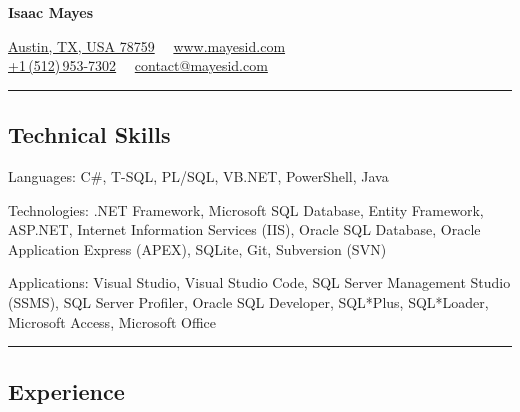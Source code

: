 \documentclass[9pt,letterpaper]{extarticle}
\newenvironment{indentsection}[1]%
{\begin{list}{}%
	{\setlength{\leftmargin}{#1}}%
	\item[]%
}
{\end{list}}
\begin{document}
\sffamily

\begin{center}
{\Huge \textbf{Isaac Mayes}}

\href{https://www.google.com/maps/place/Austin,+TX+78759/}{Austin, TX, USA 78759}\ \textbullet
\ \href{http://www.mayesid.com}{www.mayesid.com}
\\
\href{tel:+15129537302}{+1\,(512)\,953-7302}\ \textbullet
\ \href{mailto:contact@mayesid.com}{contact@mayesid.com}
\end{center}

\hrule
\vspace{-0.2em}
\subsection*{Technical Skills}

\begin{indentsection}{\parindent}
\begin{description*}
	\item[Languages:]
	C\#, T-SQL, PL/SQL, VB.NET, PowerShell, Java
	\item[Technologies:]
	.NET Framework, Microsoft SQL Database, Entity Framework, ASP.NET, Internet Information Services (IIS), Oracle SQL Database, Oracle Application Express (APEX), SQLite, Git, Subversion (SVN)
	\item[Applications:]
	Visual Studio, Visual Studio Code, SQL Server Management Studio (SSMS), SQL Server Profiler, Oracle SQL Developer, SQL*Plus, SQL*Loader, Microsoft Access, Microsoft Office
\end{description*}
\end{indentsection}

\hrule
\vspace{-0.2em}
\subsection*{Experience}
\end{document}
